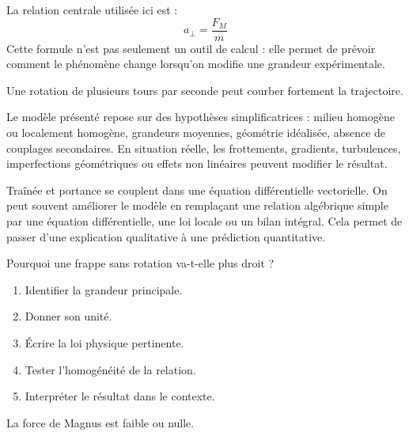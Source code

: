 \documentclass[11pt,a4paper]{article}
\begin{document}
\begin{theorembox}
La relation centrale utilisée ici est :
\[
a_{\perp}=\frac{F_M}{m}
\]
Cette formule n'est pas seulement un outil de calcul : elle permet de prévoir comment le phénomène change lorsqu'on modifie une grandeur expérimentale.
\end{theorembox}

\begin{odgbox}
Une rotation de plusieurs tours par seconde peut courber fortement la trajectoire.
\end{odgbox}

\begin{attentionbox}
Le modèle présenté repose sur des hypothèses simplificatrices : milieu homogène ou localement homogène, grandeurs moyennes, géométrie idéalisée, absence de couplages secondaires. En situation réelle, les frottements, gradients, turbulences, imperfections géométriques ou effets non linéaires peuvent modifier le résultat.
\end{attentionbox}

\begin{approfondissementbox}
Traînée et portance se couplent dans une équation différentielle vectorielle.
On peut souvent améliorer le modèle en remplaçant une relation algébrique simple par une équation différentielle, une loi locale ou un bilan intégral. Cela permet de passer d'une explication qualitative à une prédiction quantitative.
\end{approfondissementbox}

\begin{exercicebox}
Pourquoi une frappe sans rotation va-t-elle plus droit ?
\begin{enumerate}
  \item Identifier la grandeur principale.
  \item Donner son unité.
  \item Écrire la loi physique pertinente.
  \item Tester l'homogénéité de la relation.
  \item Interpréter le résultat dans le contexte.
\end{enumerate}
\end{exercicebox}

\begin{corrigebox}[Indication]
La force de Magnus est faible ou nulle.
\end{corrigebox}
\end{document}
